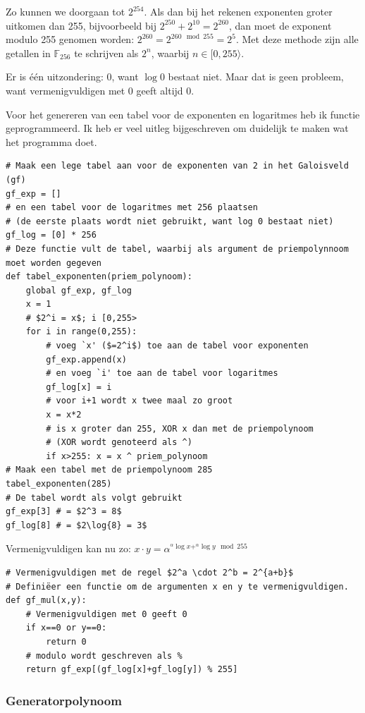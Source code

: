 \documentclass[a4paper]{article}
\begin{document}
Zo kunnen we doorgaan tot $2^{254}$. Als dan bij het rekenen exponenten groter uitkomen dan 255, bijvoorbeeld bij $2^{250}+2^{10}=2^{260}$, dan moet de exponent modulo 255 genomen worden: $2^{260}=2^{260 \mod{255}}=2^5$. Met deze methode zijn alle getallen in $\mathbb{F}_{256}$ te schrijven als $2^n$, waarbij $n \in [0,255\rangle$.

Er is één uitzondering: 0, want $\log{0}$ bestaat niet. Maar dat is geen probleem, want vermenigvuldigen met 0 geeft altijd 0.

Voor het genereren van een tabel voor de exponenten en logaritmes heb ik functie geprogrammeerd. Ik heb er veel uitleg bijgeschreven om duidelijk te maken wat het programma doet.
\begin{verbatim}
# Maak een lege tabel aan voor de exponenten van 2 in het Galoisveld (gf)
gf_exp = []
# en een tabel voor de logaritmes met 256 plaatsen
# (de eerste plaats wordt niet gebruikt, want log 0 bestaat niet)
gf_log = [0] * 256
# Deze functie vult de tabel, waarbij als argument de priempolynnoom moet worden gegeven
def tabel_exponenten(priem_polynoom):
    global gf_exp, gf_log
    x = 1 
    # $2^i = x$; i [0,255>
    for i in range(0,255):
        # voeg `x' ($=2^i$) toe aan de tabel voor exponenten
        gf_exp.append(x)
        # en voeg `i' toe aan de tabel voor logaritmes
        gf_log[x] = i
        # voor i+1 wordt x twee maal zo groot
        x = x*2
        # is x groter dan 255, XOR x dan met de priempolynoom
        # (XOR wordt genoteerd als ^)
        if x>255: x = x ^ priem_polynoom
# Maak een tabel met de priempolynoom 285
tabel_exponenten(285)
# De tabel wordt als volgt gebruikt
gf_exp[3] # = $2^3 = 8$
gf_log[8] # = $2\log{8} = 3$
\end{verbatim}

Vermenigvuldigen kan nu zo: $x\cdot y = \alpha^{^\alpha\!\log{x}+^\alpha\!\log{y} \mod 255}$
\begin{verbatim}
# Vermenigvuldigen met de regel $2^a \cdot 2^b = 2^{a+b}$
# Definiëer een functie om de argumenten x en y te vermenigvuldigen.
def gf_mul(x,y):
    # Vermenigvuldigen met 0 geeft 0
    if x==0 or y==0:
        return 0
    # modulo wordt geschreven als %
    return gf_exp[(gf_log[x]+gf_log[y]) % 255]
\end{verbatim}
\subsubsection{Generatorpolynoom}
\end{document}
